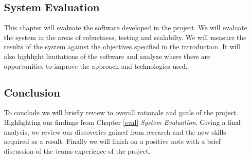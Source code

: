 \subsection{System Evaluation}
This chapter will evaluate the software developed in the project. We will evaluate the system in the areas of robustness, testing and scalabilty. We will measure the results of the system against the objectives specified in the introduction. It will also highlight limitations of the software and analyze where there are opportunities to improve the approach and technologies used,

\subsection{Conclusion}
To conclude we will briefly review to overall rationale and goals of the project. Highlighting our findings from  Chapter \ref{eval} \textit{System Evaluation}. Giving a final analysis, we review our discoveries gained from research and the new skills acquired as a result. Finally we will finish on a positive note with a brief discussion of the teams experience of the project.
